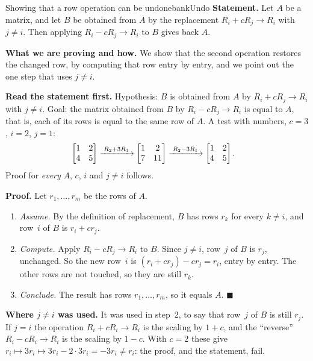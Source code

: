 \documentclass[11pt]{article}
\begin{document}
\begin{exmp}{Showing that a row operation can be undone}{bankUndo}
\textbf{Statement.} Let $A$ be a matrix, and let $B$ be obtained from $A$ by the replacement $R_i+cR_j\to R_i$ with $j\neq i$. Then applying $R_i-cR_j\to R_i$ to $B$ gives back $A$.

\textbf{What we are proving and how.} We show that the second operation restores the changed row, by computing that row entry by entry, and we point out the one step that uses $j\neq i$.

\textbf{Read the statement first.} Hypothesis: $B$ is obtained from $A$ by $R_i+cR_j\to R_i$ with $j\neq i$. Goal: the matrix obtained from $B$ by $R_i-cR_j\to R_i$ is equal to $A$, that is, each of its rows is equal to the same row of $A$. A test with numbers, $c=3$, $i=2$, $j=1$:
\begin{align*}
&\begin{bmatrix}1&2\\4&5\end{bmatrix}
\xrightarrow{\;R_2+3R_1\;}
\begin{bmatrix}1&2\\7&11\end{bmatrix}
\xrightarrow{\;R_2-3R_1\;}
\begin{bmatrix}1&2\\4&5\end{bmatrix}.
\end{align*}
Proof for \emph{every} $A$, $c$, $i$ and $j\neq i$ follows.

\textbf{Proof.} Let $r_1,\dots,r_m$ be the rows of $A$.
\begin{enumerate}[itemsep=2pt]
  \item \emph{Assume.} By the definition of replacement, $B$ has rows $r_k$ for every $k\neq i$, and row~$i$ of $B$ is $r_i+cr_j$.
  \item \emph{Compute.} Apply $R_i-cR_j\to R_i$ to $B$. Since $j\neq i$, row~$j$ of $B$ is $r_j$, unchanged. So the new row~$i$ is $(r_i+cr_j)-cr_j=r_i$, entry by entry. The other rows are not touched, so they are still $r_k$.
  \item \emph{Conclude.} The result has rows $r_1,\dots,r_m$, so it equals $A$. \qquad$\blacksquare$
\end{enumerate}

\textbf{Where $j\neq i$ was used.} It was used in step~2, to say that row~$j$ of $B$ is still $r_j$. If $j=i$ the operation $R_i+cR_i\to R_i$ is the scaling by $1+c$, and the ``reverse'' $R_i-cR_i\to R_i$ is the scaling by $1-c$. With $c=2$ these give $r_i\mapsto3r_i\mapsto3r_i-2\cdot3r_i=-3r_i\neq r_i$: the proof, and the statement, fail.
\end{exmp}
\end{document}
